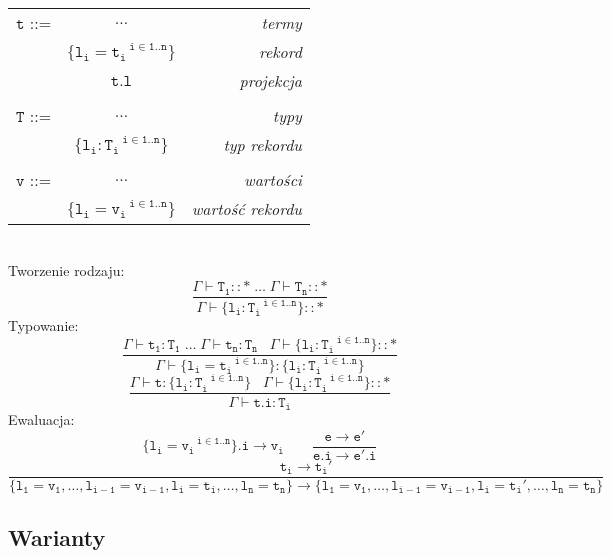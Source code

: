 \documentclass[11pt,leqno]{article}
\begin{document}
\begin{tabular}{| l c r |}
  \hline
  $\mathtt{t}$ ::= & $\dots$ & \textit{termy}  \\
   & $\mathtt{\{l_i=t_i^{\;\;\;i \in 1..n}\}}$ & \textit{rekord} \\
   & $\mathtt{t.l}$ & \textit{projekcja} \\ 
   & & \\
  $\mathtt{T}$ ::= & $\dots$ & \textit{typy}  \\
   & $\mathtt{\{l_i:T_i^{\;\;\;i \in 1..n}\}}$ & \textit{typ rekordu} \\
   & & \\
  $\mathtt{v}$ ::= & $\dots$ & \textit{wartości}  \\
   & $\mathtt{\{l_i=v_i^{\;\;\;i \in 1..n}\}}$ & \textit{wartość rekordu} \\
  \hline
\end{tabular} \\
Tworzenie rodzaju: \\
 	\[\mathtt{
             \frac{\Gamma \vdash T_1::\ast \;\dots\;\Gamma \vdash T_n::\ast}{\Gamma \vdash \{l_i:T_i^{\;\;\;i \in 1..n}\}::\ast}
		}
	\]
Typowanie:
 	\[\mathtt{
             \frac{\Gamma \vdash t_1:T_1 \;\dots\;\Gamma \vdash t_n:T_n \;\;\; \Gamma \vdash \{l_i:T_i^{\;\;\;i \in 1..n}\}::\ast}{\Gamma \vdash \{l_i=t_i^{\;\;\;i \in 1..n}\}:\{l_i:T_i^{\;\;\;i \in 1..n}\}}
            }
	\]
 	\[\mathtt{
           \frac{\Gamma \vdash t : \{l_i:T_i^{\;\;\;i \in 1..n}\} \;\;\; \Gamma \vdash \{l_i:T_i^{\;\;\;i \in 1..n}\}::\ast}{\Gamma \vdash t.i : T_i} 
            }
	\]
Ewaluacja: \\
 	\[\mathtt{
                \{l_i=v_i^{\;\;\;i \in 1..n}\}.i \longrightarrow v_i
                \qquad
                \frac{e \longrightarrow e'}{e.i \longrightarrow e'.i}
		}
	\]
\small{
 	\[\mathtt{
                \frac{t_i \longrightarrow t_i'}{\{l_1=v_1, \dots, l_{i-1}=v_{i-1}, l_i=t_i, \dots, l_n=t_n\} \longrightarrow \{l_1=v_1, \dots, l_{i-1}=v_{i-1}, l_i=t_i', \dots, l_n=t_n\}}
		}
	\]
}
\subsection{Warianty}
\end{document}
